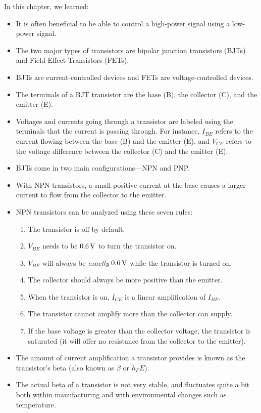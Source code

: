 In this chapter, we learned:
\begin{itemize}
\item It is often beneficial to be able to control a high-power signal using a low-power signal.
\item The two major types of transistors are bipolar junction transistors (BJTs) and Field-Effect Transistors (FETs).
\item BJTs are current-controlled devices and FETs are voltage-controlled devices.
\item The terminals of a BJT transistor are the base (B), the collector (C), and the emitter (E).
\item Voltages and currents going through a transistor are labeled using the terminals that the current is passing through.  For instance, $I_{BE}$ refers to the current flowing between the base (B) and the emitter (E), and $V_{CE}$ refers to the voltage difference between the collector (C) and the emitter (E).
\item BJTs come in two main configurations---NPN and PNP.
\item With NPN transistors, a small positive current at the base causes a larger current to flow from the collector to the emitter.
\item NPN transistors can be analyzed using these seven rules:
\begin{enumerate}
\item The transistor is off by default.
\item $V_{BE}$ needs to be $0.6\,\si{\volt}$ to turn the transistor on.
\item $V_{BE}$ will always be \emph{exactly} $0.6\,\si{\volt}$ while the transistor is turned on.
\item The collector should always be more positive than the emitter.
\item When the transistor is on, $I_{CE}$ is a linear amplification of $I_{BE}$.
\item The transistor cannot amplify more than the collector can supply.
\item If the base voltage is greater than the collector voltage, the transistor is saturated (it will offer no resistance from the collector to the emitter).
\end{enumerate}
\item The amount of current amplification a transistor provides is known as the transistor's beta (also known as $\beta$ or $h_FE$).
\item The actual beta of a transistor is not very stable, and fluctuates quite a bit both within manufacturing and with environmental changes such as temperature.

\end{itemize}
